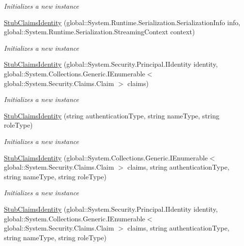 \begin{DoxyCompactItemize}
\begin{DoxyCompactList}\small\item\em Initializes a new instance\end{DoxyCompactList}\item 
\hyperlink{class_system_1_1_security_1_1_claims_1_1_fakes_1_1_stub_claims_identity_a5bea25a0e1bd66ed06a654ce03659148}{Stub\-Claims\-Identity} (global\-::\-System.\-Runtime.\-Serialization.\-Serialization\-Info info, global\-::\-System.\-Runtime.\-Serialization.\-Streaming\-Context context)
\begin{DoxyCompactList}\small\item\em Initializes a new instance\end{DoxyCompactList}\item 
\hyperlink{class_system_1_1_security_1_1_claims_1_1_fakes_1_1_stub_claims_identity_a554049b127aef7df5e78bf54480d4e32}{Stub\-Claims\-Identity} (global\-::\-System.\-Security.\-Principal.\-I\-Identity identity, global\-::\-System.\-Collections.\-Generic.\-I\-Enumerable$<$ global\-::\-System.\-Security.\-Claims.\-Claim $>$ claims)
\begin{DoxyCompactList}\small\item\em Initializes a new instance\end{DoxyCompactList}\item 
\hyperlink{class_system_1_1_security_1_1_claims_1_1_fakes_1_1_stub_claims_identity_a8c43eb8327cee858f3659ab632a5f153}{Stub\-Claims\-Identity} (string authentication\-Type, string name\-Type, string role\-Type)
\begin{DoxyCompactList}\small\item\em Initializes a new instance\end{DoxyCompactList}\item 
\hyperlink{class_system_1_1_security_1_1_claims_1_1_fakes_1_1_stub_claims_identity_a6d32c6eaff120f003f39891eb50088e6}{Stub\-Claims\-Identity} (global\-::\-System.\-Collections.\-Generic.\-I\-Enumerable$<$ global\-::\-System.\-Security.\-Claims.\-Claim $>$ claims, string authentication\-Type, string name\-Type, string role\-Type)
\begin{DoxyCompactList}\small\item\em Initializes a new instance\end{DoxyCompactList}\item 
\hyperlink{class_system_1_1_security_1_1_claims_1_1_fakes_1_1_stub_claims_identity_a703eb5e54a1138195c65af7c166fce86}{Stub\-Claims\-Identity} (global\-::\-System.\-Security.\-Principal.\-I\-Identity identity, global\-::\-System.\-Collections.\-Generic.\-I\-Enumerable$<$ global\-::\-System.\-Security.\-Claims.\-Claim $>$ claims, string authentication\-Type, string name\-Type, string role\-Type)

\end{DoxyCompactItemize}
